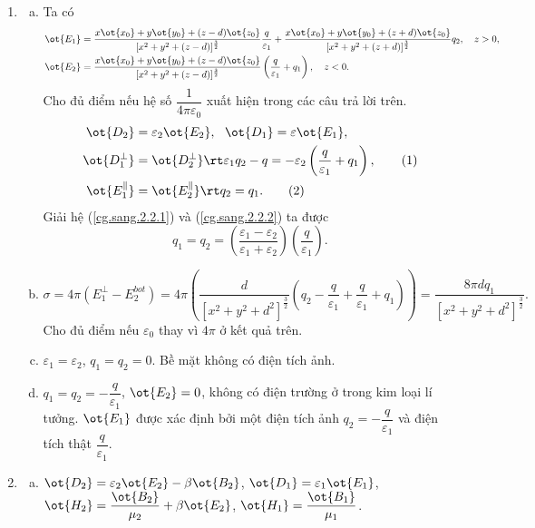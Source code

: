 \begin{loigiai}
\begin{enumerate}[1)]
    \item 
    \begin{enumerate}[a)]
        \item Ta có
        \begin{align*}
        \ot{E_1}&=\dfrac{x\ot{x_0}+y\ot{y_0}+(z-d)\ot{z_0}}{[x^2+y^2+(z-d)]^{\frac{3}{2}}}\dfrac{q}{\varepsilon_1}+\dfrac{x\ot{x_0}+y\ot{y_0}+(z+d)\ot{z_0}}{[x^2+y^2+(z+d)]^{\frac{3}{2}}}q_2,~~~z>0,\\
        \ot{E_2}&=\dfrac{x\ot{x_0}+y\ot{y_0}+(z-d)\ot{z_0}}{[x^2+y^2+(z-d)]^{\frac{3}{2}}}\left(\dfrac{q}{\varepsilon_1}+q_1\right),~~~z<0.
    \end{align*}
    Cho đủ điểm nếu hệ số $\dfrac{1}{4\pi\varepsilon_0}$ xuất hiện trong các câu trả lời trên.
    \begin{align*}
        \ot{D_2} &= \varepsilon_2\ot{E_2},~~\ot{D_1}=\varepsilon\ot{E_1},\\
        \ot{D_1^{\bot}} &= \ot{D_2^{\bot}}\rt \varepsilon_1q_2-q=-\varepsilon_2\left(\dfrac{q}{\varepsilon_1}+q_1\right),\tag{1} \label{cg.sang.2.2.1}\\
        \ot{E_1^{\parallel}} &= \ot{E_2^{\parallel}}\rt q_2=q_1. \tag{2} \label{cg.sang.2.2.2}
    \end{align*}
    Giải hệ (\ref{cg.sang.2.2.1}) và (\ref{cg.sang.2.2.2}) ta được 
    \[q_1=q_2=\left(\dfrac{\varepsilon_1-\varepsilon_2}{\varepsilon_1+\varepsilon_2}\right)\left(\dfrac{q}{\varepsilon_1}\right).\]
    \item 
    \[\sigma=4\pi(E_1^{\bot}-E_2^{bot})=4\pi\left(\dfrac{d}{[x^2+y^2+d^2]^{\frac{3}{2}}}\left(q_2-\dfrac{q}{\varepsilon_1}+\dfrac{q}{\varepsilon_1}+q_1\right)\right)=\dfrac{8\pi dq_1}{[x^2+y^2+d^2]^{\frac{3}{2}}}.\]
    Cho đủ điểm nếu $\varepsilon_0$ thay vì $4\pi$ ở kết quả trên.
    \item $\varepsilon_1=\varepsilon_2$, $q_1=q_2=0$. Bề mặt không có điện tích ảnh.
    \item $q_1=q_2=-\dfrac{q}{\varepsilon_1}$, $\ot{E_2}=0$, không có điện trường ở trong kim loại lí tưởng. $\ot{E_1}$ được xác định bởi một điện tích ảnh $q_2=-\dfrac{q}{\varepsilon_1}$ và điện tích thật $\dfrac{q}{\varepsilon_1}$.
    \end{enumerate}
    \item 
    \begin{enumerate}[a)]
        \item 
        $\ot{D_2}=\varepsilon_2\ot{E_2}-\beta\ot{B_2}$, $\ot{D_1}=\varepsilon_1\ot{E_1}$, $\ot{H_2}=\dfrac{\ot{B_2}}{\mu_2}+\beta\ot{E_2}$, $\ot{H_1}=\dfrac{\ot{B_1}}{\mu_1}$.

\end{enumerate}
\end{enumerate}
\end{loigiai}
